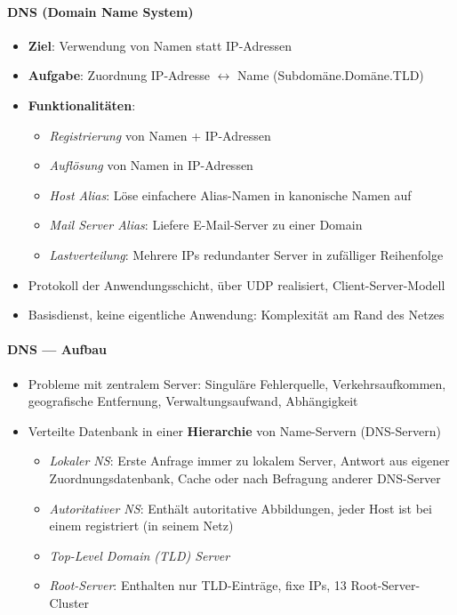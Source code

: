 \paragraph{DNS (Domain Name System)}
\begin{itemize}
  \item \textbf{Ziel}: Verwendung von Namen statt IP-Adressen
  \item \textbf{Aufgabe}: Zuordnung IP-Adresse \( \leftrightarrow \) Name (Subdomäne.Domäne.TLD)
  \item \textbf{Funktionalitäten}:
  \begin{itemize}
    \item \emph{Registrierung} von Namen + IP-Adressen
    \item \emph{Auflösung} von Namen in IP-Adressen
    \item \emph{Host Alias}: Löse einfachere Alias-Namen in kanonische Namen auf
    \item \emph{Mail Server Alias}: Liefere E-Mail-Server zu einer Domain
    \item \emph{Lastverteilung}: Mehrere IPs redundanter Server in zufälliger Reihenfolge
  \end{itemize}
  \item Protokoll der Anwendungsschicht, über UDP realisiert, Client-Server-Modell
  \item Basisdienst, keine eigentliche Anwendung: Komplexität am Rand des Netzes
\end{itemize}

\paragraph{DNS --- Aufbau}
\begin{itemize}
	\item Probleme mit zentralem Server: Singuläre Fehlerquelle, Verkehrsaufkommen, geografische Entfernung, Verwaltungsaufwand, Abhängigkeit
  \item Verteilte Datenbank in einer \textbf{Hierarchie} von Name-Servern (DNS-Servern)
  \begin{itemize}
    \item \emph{Lokaler NS}: Erste Anfrage immer zu lokalem Server, Antwort aus eigener Zuordnungsdatenbank, Cache oder nach Befragung anderer DNS-Server
    \item \emph{Autoritativer NS}: Enthält autoritative Abbildungen, jeder Host ist bei einem registriert (in seinem Netz)
    \item \emph{Top-Level Domain (TLD) Server}
    \item \emph{Root-Server}: Enthalten nur TLD-Einträge, fixe IPs, 13 Root-Server-Cluster
  \end{itemize}
\end{itemize}

